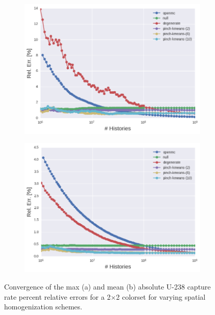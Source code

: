\clearpage

\begin{figure}[h!]
\centering
\begin{subfigure}{\textwidth}
  \centering
  \includegraphics[width=0.9\linewidth]{figures/results/2x2/ensemble-transform/evo-capture-max}
  \caption{}
  \label{fig:chap11-2x2-capture-converge-max}
\end{subfigure}
\begin{subfigure}{\textwidth}
  \centering
  \includegraphics[width=0.9\linewidth]{figures/results/2x2/ensemble-transform/evo-capture-mean}
  \caption{}
  \label{fig:chap11-2x2-capture-converge-mean}
\end{subfigure}
\vspace{2mm}
\caption[Fission rate covergence for a 2$\times$2 colorset]{Convergence of the max (a) and mean (b) absolute U-238 capture rate percent relative errors for a 2$\times$2 colorset for varying spatial homogenization schemes.}
\label{fig:chap11-2x2-capture-converge}
\end{figure}

\clearpage
